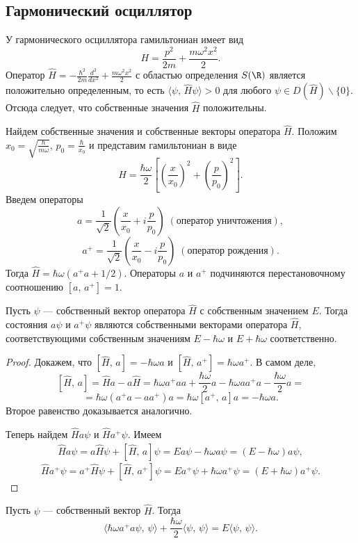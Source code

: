 \documentclass[a4paper
]{article}
\begin{document}
\subsection{Гармонический осциллятор}
У гармонического осциллятора гамильтониан имеет вид
$$H=\frac{p^2}{2m}+\frac{m\omega^2 x^2}{2}.$$
Оператор $\hat{H}=-\frac{\hbar^2}{2m}\frac{d^2}{dx^2}+\frac{m\omega^2 x^2}{2}$
с областью определения $S(\R)$ является положительно определенным, то есть
$\langle \psi, \, \hat{H}\psi\rangle>0$ для любого $\psi\in D(\hat{H})
\backslash \{0\}$. Отсюда следует, что собственные значения $\hat{H}$
положительны. \par
Найдем собственные значения и собственные векторы оператора $\hat H$.
Положим $x_0=\sqrt{\frac{\hbar}{m\omega}}$, $p_0=\frac{\hbar}{x_0}$ и
представим гамильтониан в виде
$$H=\frac{\hbar\omega}{2}\left[\left(\frac{x}{x_0}\right)^2+
\left(\frac{p}{p_0}\right)^2\right].$$ Введем операторы
$$a=\frac{1}{\sqrt{2}}\left(\frac{x}{x_0}+i\frac{p}{p_0}\right) \;
(\text{оператор уничтожения}),$$
$$a^+=\frac{1}{\sqrt{2}}\left(\frac{x}{x_0}-i\frac{p}{p_0}\right) \;
(\text{оператор рождения}).$$
Тогда $\hat{H}=\hbar\omega(a^+a+1/2)$. Операторы $a$ и $a^+$ подчиняются
перестановочному соотношению $[a, \, a^+]=1$. \par
\begin{Sta}
Пусть $\psi$ --- собственный вектор оператора $\hat H$ с собственным
значением $E$. Тогда состояния $a\psi$ и $a^+\psi$ являются собственными
векторами оператора $\hat{H}$, соответствующими собственным значениям
$E-\hbar\omega$ и $E+\hbar\omega$ соответственно.
\end{Sta}
\begin{proof}
Докажем, что $[\hat H, \, a]=-\hbar\omega a$ и $[\hat H, \, a^+]=\hbar
\omega a^+$. В самом деле,
$$[\hat H, \, a]=\hat Ha-a\hat H=\hbar\omega a^+aa+\frac{\hbar\omega}{2}a-
\hbar\omega aa^+a-\frac{\hbar\omega}{2}a=$$
$$=\hbar\omega(a^+a-aa^+)a=\hbar\omega[a^+, \, a]a=-\hbar\omega a.$$
Второе равенство доказывается аналогично. \par
Теперь найдем $\hat Ha\psi$ и $\hat Ha^+\psi$. Имеем
\begin{align}
\label{6han}
\hat Ha\psi=a\hat H\psi+[\hat H, \, a]\psi=Ea\psi-\hbar\omega a\psi
=(E-\hbar\omega)a\psi,
\end{align}
$$\hat Ha^+\psi=a^+\hat H\psi+[\hat H, \, a^+]\psi=Ea^+\psi+\hbar
\omega a^+\psi=(E+\hbar\omega)a^+\psi.$$
\end{proof}
Пусть $\psi$ --- собственный вектор $\hat{H}$. Тогда
$$\langle \hbar\omega a^+a\psi, \, \psi\rangle +\frac{\hbar\omega}{2}
\langle\psi , \, \psi\rangle =E\langle \psi , \, \psi\rangle .$$
\end{document}
